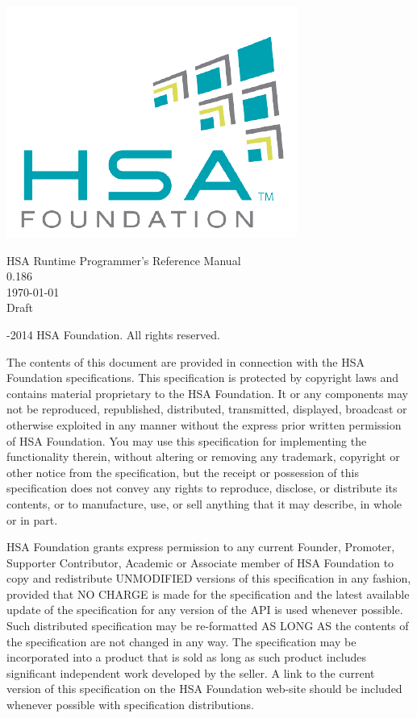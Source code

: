 \documentclass[final]{book}
\newcommand{\doctitle}{HSA Runtime Programmer's Reference Manual}
\newcommand{\docversion}{0.186}
\begin{document}

\begin{titlepage}
\includegraphics[width=.4\textwidth]{fig/foundation_small.png}
\vspace*{7cm}
\begin{center}
{\Large \doctitle\\[1ex]\large\docversion}\\
\vspace*{1cm}
\vspace*{0.5cm}
{\small \today}\\
\vspace*{0.5cm}
{\small Draft}\\
\end{center}
\end{titlepage}
\thispagestyle{empty} {-2014 HSA Foundation. All rights
  reserved.}


The contents of this document are provided in connection with the HSA Foundation
specifications. This specification is protected by copyright laws and contains
material proprietary to the HSA Foundation. It or any components may not be
reproduced, republished, distributed, transmitted, displayed, broadcast or
otherwise exploited in any manner without the express prior written permission
of HSA Foundation. You may use this specification for implementing the
functionality therein, without altering or removing any trademark, copyright or
other notice from the specification, but the receipt or possession of this
specification does not convey any rights to reproduce, disclose, or distribute
its contents, or to manufacture, use, or sell anything that it may describe, in
whole or in part.

HSA Foundation grants express permission to any current Founder, Promoter,
Supporter Contributor, Academic or Associate member of HSA Foundation to copy
and redistribute UNMODIFIED versions of this specification in any fashion,
provided that NO CHARGE is made for the specification and the latest available
update of the specification for any version of the API is used whenever
possible. Such distributed specification may be re-formatted AS LONG AS the
contents of the specification are not changed in any way. The specification may
be incorporated into a product that is sold as long as such product includes
significant independent work developed by the seller. A link to the current
version of this specification on the HSA Foundation web-site should be included
whenever possible with specification distributions.
\end{document}
